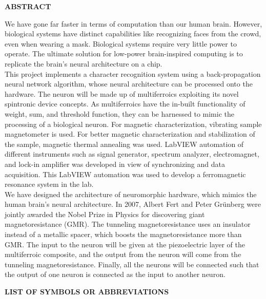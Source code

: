 \documentclass[12pt,a4paper,bold]{thesis}
\theoremstyle{thm}
\theoremstyle{definition}
\newcommand{\head}[1]{\newpage
\vspace{3em}
\begin{center}
\LARGE{\MakeUppercase{\textbf{#1}}}
\end{center}
\vspace{3em}
\addcontentsline{toc}{chapter}{#1}
}
\begin{document}
%
\head{Abstract} 
\indent \indent \indent We have gone far faster in terms of computation than our human brain. However, biological systems have distinct capabilities like recognizing faces from the crowd, even when wearing a mask. Biological systems require very little power to operate. The ultimate solution for low-power brain-inspired computing is to replicate the brain's neural architecture on a chip.\\
\indent \indent This project implements a character recognition system using a back-propagation neural network algorithm, whose neural architecture can be processed onto the hardware. The neuron will be made up of multiferroics exploiting its novel spintronic device concepts. As multiferroics have the in-built functionality of weight, sum, and threshold function, they can be harnessed to mimic the processing of a biological neuron. For magnetic characterization, vibrating sample magnetometer is used. For better magnetic characterization and stabilization of the sample, magnetic thermal annealing was used. LabVIEW automation of different instruments such as signal generator, spectrum analyzer, electromagnet, and lock-in amplifier was developed in view of synchronizing and data acquisition. This LabVIEW automation was used to develop a ferromagnetic resonance system in the lab.\\
\indent \indent We have designed the architecture of neuromorphic hardware, which mimics the human brain's neural architecture. In 2007, Albert Fert and Peter Gr{\"u}nberg were jointly awarded the Nobel Prize in Physics for discovering giant magnetoresistance (GMR). The tunneling magnetoresistance uses an insulator instead of a metallic spacer, which boosts the magnetoresistance more than GMR. The input to the neuron will be given at the piezoelectric layer of the multiferroic composite, and the output from the neuron will come from the tunneling magnetoresistance. Finally, all the neurons will be connected such that the output of one neuron is connected as the input to another neuron. 
 
\head{List of Symbols or Abbreviations}
\end{document}
